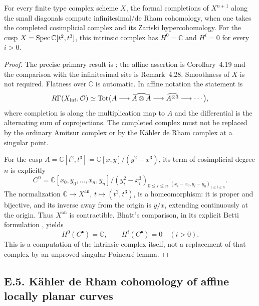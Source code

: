 \begin{theorem}\label{thm:DE-intrinsic-nerve}
For every finite type complex scheme $X$, the formal completions of $X^{n+1}$ along the small diagonals compute infinitesimal/de Rham cohomology, when one takes the completed cosimplicial complex and its Zariski hypercohomology.  For the cusp $X=\operatorname{Spec}\mathbb C[t^2,t^3]$, this intrinsic complex has $H^0=\mathbb C$ and $H^i=0$ for every $i>0$.
\end{theorem}
\begin{proof}
The precise primary result is \cite[Corollary~4.30]{Bhatt2012}; the affine assertion is Corollary~4.19 and the comparison with the infinitesimal site is Remark~4.28.  Smoothness of $X$ is not required.  Flatness over $\mathbb C$ is automatic.  In affine notation the statement is
\[
 R\Gamma(X_{\mathrm{inf}},\mathcal O)\simeq
 \operatorname{Tot}\bigl(A\longrightarrow\widehat{A\otimes A}
     \longrightarrow\widehat{A^{\otimes3}}\longrightarrow\cdots\bigr),
\]
where completion is along the multiplication map to $A$ and the differential is the alternating sum of coprojections.  The completed complex must not be replaced by the ordinary Amitsur complex or by the K\"ahler de Rham complex at a singular point.

For the cusp $A=\mathbb C[t^2,t^3]=\mathbb C[x,y]/(y^2-x^3)$, its term of cosimplicial degree $n$ is explicitly
\[
 C^n=\mathbb C[x_0,y_0,\ldots,x_n,y_n]/(y_i^2-x_i^3)_{0\leq i\leq n}
       \ {}^{\widehat{\ }}_{(x_i-x_0,y_i-y_0)_{1\leq i\leq n}}.
\]
The normalization $\mathbb C\to X^{\mathrm{an}}$, $t\mapsto(t^2,t^3)$, is a homeomorphism: it is proper and bijective, and its inverse away from the origin is $y/x$, extending continuously at the origin.  Thus $X^{\mathrm{an}}$ is contractible.  Bhatt's comparison, in its explicit Betti formulation \cite[Example~4.23]{Bhatt2012}, yields
\[
 H^0(C^\bullet)=\mathbb C,\qquad H^i(C^\bullet)=0\quad(i>0).
\]
This is a computation of the intrinsic complex itself, not a replacement of that complex by an unproved singular Poincar\'e lemma.
\end{proof}

\subsection{E.5. K\"ahler de Rham cohomology of affine locally planar curves}

